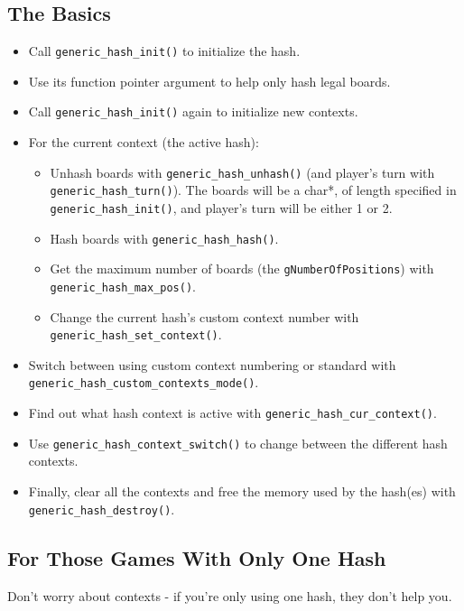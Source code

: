 \documentclass[11pt]{article}
\begin{document}
\subsection{The Basics}
\begin{itemize}
\item Call \texttt{generic\_hash\_init()} to initialize the hash.
\item Use its function pointer argument to help only hash legal boards.
\item Call \texttt{generic\_hash\_init()} again to initialize new contexts.
\item For the current context (the active hash):
\begin{itemize}
\item Unhash boards with \texttt{generic\_hash\_unhash()} (and player's turn with \texttt{generic\_hash\_turn()}). The boards will be a char*, of length specified in \texttt{generic\_hash\_init()}, and player's turn will be either 1 or 2.
\item Hash boards with \texttt{generic\_hash\_hash()}.
\item Get the maximum number of boards (the \texttt{gNumberOfPositions}) with \\\texttt{generic\_hash\_max\_pos()}.
\item Change the current hash's custom context number with \\\texttt{generic\_hash\_set\_context()}.
\end{itemize}
\item Switch between using custom context numbering or standard with \\\texttt{generic\_hash\_custom\_contexts\_mode()}.
\item Find out what hash context is active with \texttt{generic\_hash\_cur\_context()}.
\item Use \texttt{generic\_hash\_context\_switch()} to change between the different hash contexts.

\item Finally, clear all the contexts and free the memory used by the hash(es) with \\\texttt{generic\_hash\_destroy()}.
\end{itemize}

\subsection{For Those Games With Only One Hash}

Don't worry about contexts - if you're only using one hash, they don't help you.
\end{document}
